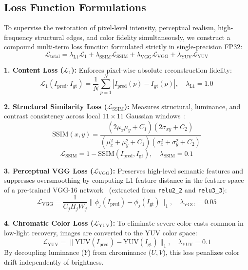 \documentclass[journal,onecolumn,11pt]{IEEEtran}
\begin{document}
\subsection{Loss Function Formulations}
To supervise the restoration of pixel-level intensity, perceptual realism, high-frequency structural edges, and color fidelity simultaneously, we construct a compound multi-term loss function formulated strictly in single-precision FP32:
\begin{equation}
\mathcal{L}_{\text{total}} = \lambda_{\text{L1}} \mathcal{L}_1 + \lambda_{\text{SSIM}} \mathcal{L}_{\text{SSIM}} + \lambda_{\text{VGG}} \mathcal{L}_{\text{VGG}} + \lambda_{\text{YUV}} \mathcal{L}_{\text{YUV}}
\end{equation}

\textbf{1. Content Loss ($\mathcal{L}_1$):} Enforces pixel-wise absolute reconstruction fidelity:
\begin{equation}
\mathcal{L}_1(I_{\text{pred}}, I_{\text{gt}}) = \frac{1}{N} \sum_{p=1}^N |I_{\text{pred}}(p) - I_{\text{gt}}(p)|, \quad \lambda_{\text{L1}} = 1.0
\end{equation}

\textbf{2. Structural Similarity Loss ($\mathcal{L}_{\text{SSIM}}$):} Measures structural, luminance, and contrast consistency across local $11\times 11$ Gaussian windows~\cite{wang2004image}:
\begin{equation}
\text{SSIM}(x, y) = \frac{(2\mu_x\mu_y + C_1)(2\sigma_{xy} + C_2)}{(\mu_x^2 + \mu_y^2 + C_1)(\sigma_x^2 + \sigma_y^2 + C_2)}
\end{equation}
\begin{equation}
\mathcal{L}_{\text{SSIM}} = 1 - \text{SSIM}(I_{\text{pred}}, I_{\text{gt}}), \quad \lambda_{\text{SSIM}} = 0.1
\end{equation}

\textbf{3. Perceptual VGG Loss ($\mathcal{L}_{\text{VGG}}$):} Preserves high-level semantic features and suppresses oversmoothing by computing L1 feature distance in the feature space of a pre-trained VGG-16 network~\cite{johnson2016perceptual,simonyan2014very} (extracted from \texttt{relu2\_2} and \texttt{relu3\_3}):
\begin{equation}
\mathcal{L}_{\text{VGG}} = \frac{1}{C_j H_j W_j} \|\phi_j(I_{\text{pred}}) - \phi_j(I_{\text{gt}})\|_1, \quad \lambda_{\text{VGG}} = 0.05
\end{equation}

\textbf{4. Chromatic Color Loss ($\mathcal{L}_{\text{YUV}}$):} To eliminate severe color casts common in low-light recovery, images are converted to the YUV color space:
\begin{equation}
\mathcal{L}_{\text{YUV}} = \|\text{YUV}(I_{\text{pred}}) - \text{YUV}(I_{\text{gt}})\|_1, \quad \lambda_{\text{YUV}} = 0.1
\end{equation}
By decoupling luminance ($Y$) from chrominance ($U, V$), this loss penalizes color drift independently of brightness.
\end{document}

